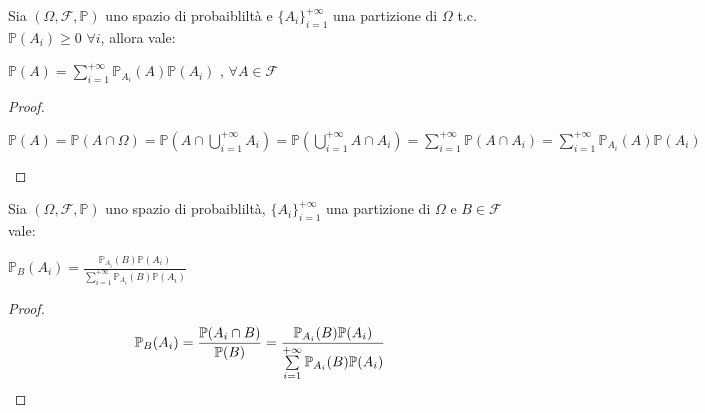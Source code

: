 \begin{theorem}
    Sia $(\Omega,\mathscr{F},\mathbb{P})$ uno spazio di probaibliltà e $\{{A_i}\}_{i=1}^{+\infty}$ una partizione di $\Omega$ t.c. $\mathbb{P}(A_i)\geq0$ $\forall i$, allora vale:
    \begin{center}
        $\mathbb{P}(A)=\sum\limits_{i=1}^{+\infty}\mathbb{P}_{A_i}(A)\mathbb{P}(A_i)$ , $\forall A\in\mathscr{F}$
    \end{center}
\begin{proof}
\begin{center}
$\mathbb{P}(A)=\mathbb{P}(A\cap \Omega)=\mathbb{P}(A\cap\bigcup\limits_{i=1}^{+\infty}A_i)=\mathbb{P}(\bigcup\limits_{i=1}^{+\infty}A\cap A_i)=\sum\limits_{i=1}^{+\infty}\mathbb{P}(A\cap A_i)=\sum\limits_{i=1}^{+\infty}\mathbb{P}_{A_i}(A)\mathbb{P}(A_i)$
\end{center}
\end{proof}    
\end{theorem}

\begin{theorem}
    Sia $(\Omega,\mathscr{F},\mathbb{P})$ uno spazio di probaibliltà, $\{{A_i}\}_{i=1}^{+\infty}$ una partizione di $\Omega$ e $B\in\mathscr{F}$ vale:
    \begin{center}
        $\mathbb{P}_B(A_i)=${\large$\frac{\mathbb{P}_{A_i}(B)\mathbb{P}(A_i)}{\sum\limits_{i=1}^{+\infty}\mathbb{P}_{A_i}(B)\mathbb{P}(A_i)}$}
    \end{center}
\begin{proof}
\vspace{5px}
    \[\mathbb{P}_B(A_i)={\large\frac{\mathbb{P}(A_i\cap B)}{\mathbb{P}(B)}=\frac{\mathbb{P}_{A_i}(B)\mathbb{P}(A_i)}{\sum\limits_{i=1}^{+\infty}\mathbb{P}_{A_i}(B)\mathbb{P}(A_i)}}\]
\end{proof}    
\end{theorem}